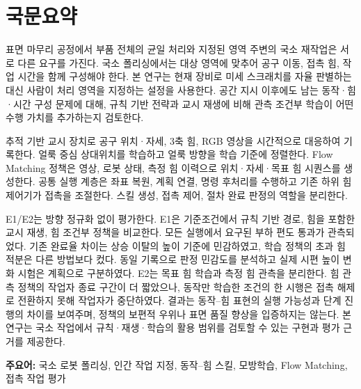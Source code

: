 \chapter*{국문요약}
\begin{center}\large\bfseries\thesistitlekr\end{center}

표면 마무리 공정에서 부품 전체의 균일 처리와 지정된 영역 주변의 국소 재작업은 서로 다른 요구를 가진다. 국소 폴리싱에서는 대상 영역에 맞추어 공구 이동, 접촉 힘, 작업 시간을 함께 구성해야 한다. 본 연구는 현재 장비로 미세 스크래치를 자율 판별하는 대신 사람이 처리 영역을 지정하는 설정을 사용한다. 공간 지시 이후에도 남는 동작·힘·시간 구성 문제에 대해, 규칙 기반 전략과 교시 재생에 비해 관측 조건부 학습이 어떤 수행 가치를 추가하는지 검토한다.

추적 기반 교시 장치로 공구 위치·자세, 3축 힘, RGB 영상을 시간적으로 대응하여 기록한다. 얼룩 중심 상대위치를 학습하고 얼룩 방향을 학습 기준에 정렬한다. Flow Matching 정책은 영상, 로봇 상태, 측정 힘 이력으로 위치·자세·목표 힘 시퀀스를 생성한다. 공통 실행 계층은 좌표 복원, 계획 연결, 명령 후처리를 수행하고 기존 하위 힘제어기가 접촉을 조절한다. 스킬 생성, 접촉 제어, 절차 완료 판정의 역할을 분리한다.

E1/E2는 방향 정규화 없이 평가한다. E1은 기준조건에서 규칙 기반 경로, 힘을 포함한 교시 재생, 힘 조건부 정책을 비교한다. 모든 실행에서 요구된 부하 편도 통과가 관측되었다. 기존 완료율 차이는 상승 이탈의 높이 기준에 민감하였고, 학습 정책의 초과 힘 적분은 다른 방법보다 컸다. 동일 기록으로 판정 민감도를 분석하고 실제 시편 높이 변화 시험은 계획으로 구분하였다. E2는 목표 힘 학습과 측정 힘 관측을 분리한다. 힘 관측 정책의 작업자 종료 구간이 더 짧았으나, 동작만 학습한 조건의 한 시행은 접촉 해제로 전환하지 못해 작업자가 중단하였다. 결과는 동작--힘 표현의 실행 가능성과 단계 진행의 차이를 보여주며, 정책의 보편적 우위나 표면 품질 향상을 입증하지는 않는다. 본 연구는 국소 작업에서 규칙·재생·학습의 활용 범위를 검토할 수 있는 구현과 평가 근거를 제공한다.

\vspace{0.4cm}
\noindent\textbf{주요어:} 국소 로봇 폴리싱, 인간 작업 지정, 동작--힘 스킬, 모방학습, Flow Matching, 접촉 작업 평가
